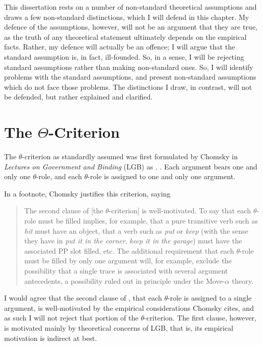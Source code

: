 \documentclass[MilwayThesis]{subfiles}
\begin{document}
This dissertation rests on a number of non-standard theoretical assumptions and draws a few non-standard distinctions, which I will defend in this chapter.
My defence of the assumptions, however, will not be an argument that they are true, as the truth of any theoretical statement ultimately depends on the empirical facts.
Rather, my defence will actually be an offence; I will argue that the standard assumption is, in fact, ill-founded.
So, in a sense, I will be rejecting standard assumptions rather than making non-standard ones.
So, I will identify problems with the standard assumptions, and present non-standard assumptions which do not face those problems.
The distinctions I draw, in contrast, will not be defended, but rather explained and clarified.

\section{The $\Theta$-Criterion}\label{sec:theta-crit}
The $\theta$-criterion as standardly assumed was first formulated by Chomsky in \textit{Lectures on Government and Binding} (LGB) as \Next.
\ex. Each argument bears one and only one $\theta$-role, and each $\theta$-role is assigned to one and only one argument. \parencite[36]{chomsky1981lectures}

In a footnote, Chomsky justifies this criterion, saying 
\begin{quote}
	The second clause of [the $\theta$-criterion] is well-motivated.
	To say that each $\theta$-role must be filled implies, for example, that a pure transitive verb such as \textit{hit} must have an object, that a verb such as \textit{put} or \textit{keep} (with the sense they have in \textit{put it in the corner}, \textit{keep it in the garage}) must have the associated PP slot filled, etc. 
	The additional requirement that each $\theta$-role must be filled by only one argument will, for example, exclude the possibility that a single trace is associated with several argument antecedents, a possibility ruled out in principle under the Move-$\alpha$ theory. 
	\parencite[139]{chomsky1981lectures}
\end{quote}
I would agree that the second clause of \Last, that each $\theta$-role is assigned to a single argument, is well-motivated by the empirical considerations Chomsky cites, and as such I will not reject that portion of the $\theta$-criterion.
The first clause, however, is motivated mainly by theoretical concerns of LGB, that is, its empirical motivation is indirect at best.
\end{document}
